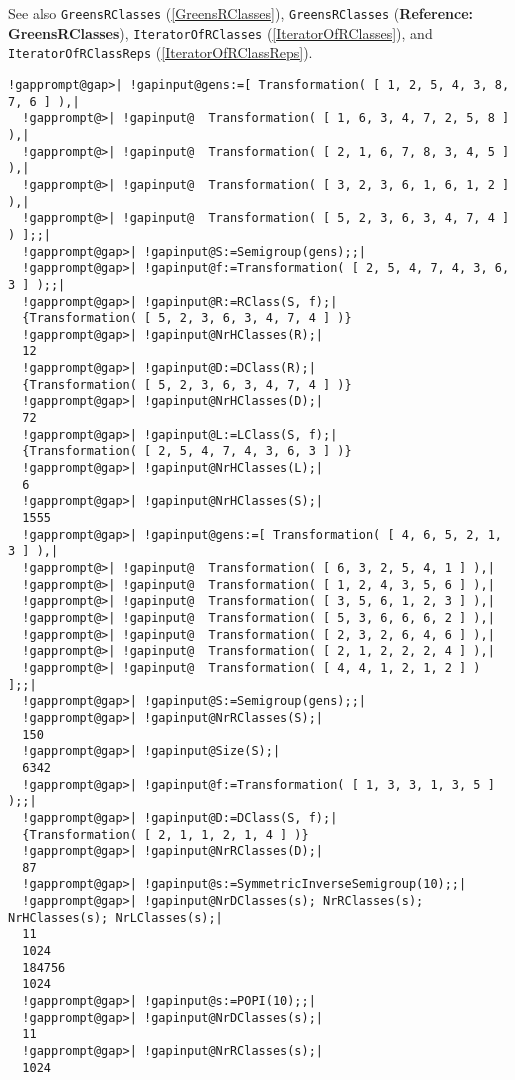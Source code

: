 \documentclass[a4paper,11pt]{report}
\begin{document}
{{{ See also \texttt{GreensRClasses} (\ref{GreensRClasses}), \texttt{GreensRClasses} (\textbf{Reference: GreensRClasses}), \texttt{IteratorOfRClasses} (\ref{IteratorOfRClasses}), and \texttt{IteratorOfRClassReps} (\ref{IteratorOfRClassReps}). 
\begin{Verbatim}[commandchars=!@|,fontsize=\small,frame=single,label=Example]
  !gapprompt@gap>| !gapinput@gens:=[ Transformation( [ 1, 2, 5, 4, 3, 8, 7, 6 ] ),|
  !gapprompt@>| !gapinput@  Transformation( [ 1, 6, 3, 4, 7, 2, 5, 8 ] ),|
  !gapprompt@>| !gapinput@  Transformation( [ 2, 1, 6, 7, 8, 3, 4, 5 ] ),|
  !gapprompt@>| !gapinput@  Transformation( [ 3, 2, 3, 6, 1, 6, 1, 2 ] ),|
  !gapprompt@>| !gapinput@  Transformation( [ 5, 2, 3, 6, 3, 4, 7, 4 ] ) ];;|
  !gapprompt@gap>| !gapinput@S:=Semigroup(gens);;|
  !gapprompt@gap>| !gapinput@f:=Transformation( [ 2, 5, 4, 7, 4, 3, 6, 3 ] );;|
  !gapprompt@gap>| !gapinput@R:=RClass(S, f);|
  {Transformation( [ 5, 2, 3, 6, 3, 4, 7, 4 ] )}
  !gapprompt@gap>| !gapinput@NrHClasses(R);|
  12
  !gapprompt@gap>| !gapinput@D:=DClass(R);|
  {Transformation( [ 5, 2, 3, 6, 3, 4, 7, 4 ] )}
  !gapprompt@gap>| !gapinput@NrHClasses(D);|
  72
  !gapprompt@gap>| !gapinput@L:=LClass(S, f);|
  {Transformation( [ 2, 5, 4, 7, 4, 3, 6, 3 ] )}
  !gapprompt@gap>| !gapinput@NrHClasses(L);|
  6
  !gapprompt@gap>| !gapinput@NrHClasses(S);|
  1555
  !gapprompt@gap>| !gapinput@gens:=[ Transformation( [ 4, 6, 5, 2, 1, 3 ] ),|
  !gapprompt@>| !gapinput@  Transformation( [ 6, 3, 2, 5, 4, 1 ] ),|
  !gapprompt@>| !gapinput@  Transformation( [ 1, 2, 4, 3, 5, 6 ] ),|
  !gapprompt@>| !gapinput@  Transformation( [ 3, 5, 6, 1, 2, 3 ] ),|
  !gapprompt@>| !gapinput@  Transformation( [ 5, 3, 6, 6, 6, 2 ] ),|
  !gapprompt@>| !gapinput@  Transformation( [ 2, 3, 2, 6, 4, 6 ] ),|
  !gapprompt@>| !gapinput@  Transformation( [ 2, 1, 2, 2, 2, 4 ] ),|
  !gapprompt@>| !gapinput@  Transformation( [ 4, 4, 1, 2, 1, 2 ] ) ];;|
  !gapprompt@gap>| !gapinput@S:=Semigroup(gens);;|
  !gapprompt@gap>| !gapinput@NrRClasses(S);|
  150
  !gapprompt@gap>| !gapinput@Size(S);|
  6342
  !gapprompt@gap>| !gapinput@f:=Transformation( [ 1, 3, 3, 1, 3, 5 ] );;|
  !gapprompt@gap>| !gapinput@D:=DClass(S, f);|
  {Transformation( [ 2, 1, 1, 2, 1, 4 ] )}
  !gapprompt@gap>| !gapinput@NrRClasses(D);|
  87
  !gapprompt@gap>| !gapinput@s:=SymmetricInverseSemigroup(10);;|
  !gapprompt@gap>| !gapinput@NrDClasses(s); NrRClasses(s); NrHClasses(s); NrLClasses(s);|
  11
  1024
  184756
  1024
  !gapprompt@gap>| !gapinput@s:=POPI(10);;|
  !gapprompt@gap>| !gapinput@NrDClasses(s);|
  11
  !gapprompt@gap>| !gapinput@NrRClasses(s);|
  1024
\end{Verbatim}
 }

}}
\end{document}
